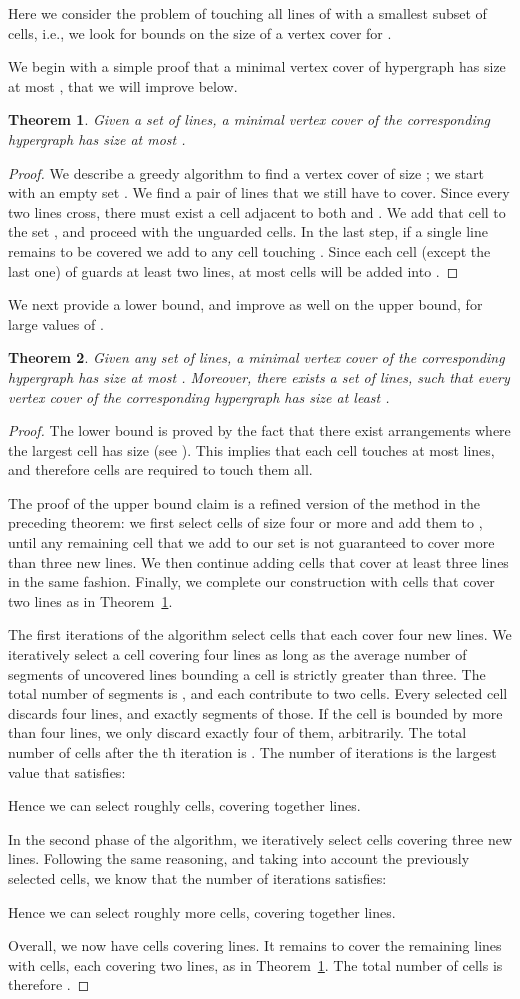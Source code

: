 \documentclass[11pt,a4paper]{article}
\newtheorem{theorem}{Theorem}
\newcommand{\sholong}[2]{#2}
\newcommand{\proofguardwithcells}{The first iterations of the algorithm select cells that each cover four new lines. 
We iteratively select a cell covering four lines as long as the average number of segments of uncovered lines bounding a cell is strictly greater than three. The total number of segments is , and each contribute to two cells. Every selected cell discards four lines, and exactly  segments of those. If the cell is bounded by more than four lines, we only discard exactly four of them, arbitrarily. The total number of cells after the th iteration is . The number of iterations is the largest value  that satisfies:

Hence we can select roughly  cells, covering together  lines.

In the second phase of the algorithm, we iteratively select cells covering three new lines. Following the same reasoning, and taking into account the  previously selected cells, we know that the number  of iterations satisfies:

Hence we can select roughly  more cells, covering together  lines.

Overall, we now have  cells covering  lines. It remains to cover the remaining  lines with  cells, each covering two lines, as in Theorem~\ref{warmup:guardwithcells}. The total number of cells is therefore
}
\begin{document}
Here we consider the problem of touching all lines of  with a smallest subset of cells, i.e., we look for bounds on the size of a vertex cover for .



We begin with a simple proof that a minimal vertex cover of  hypergraph has size at most , that we will improve below.
\begin{theorem}\label{warmup:guardwithcells}
Given a set  of  lines, a minimal vertex cover of the corresponding  hypergraph has size at most .
\end{theorem}
\begin{proof}
We describe a greedy algorithm to find a vertex cover of size ; we start with an empty set . We find a pair  of lines that we still have to cover. Since every two lines cross, there must exist a cell  adjacent to both  and . We add that cell  to the set , and proceed with the unguarded cells. In the last step, if a single line  remains to be covered we add  to  any cell touching . Since each cell (except the last one) of  guards at least two lines, at most  cells will be added into .
\end{proof}

We next provide a lower bound, and improve as well on the upper bound, for large values of . 
\begin{theorem}\label{guardwithcells}
Given any set  of  lines, a minimal vertex cover of the corresponding  hypergraph has size at most . Moreover, there exists a set  of  lines, such that every vertex cover of the corresponding  hypergraph has size at least .
\end{theorem}
\begin{proof}
The lower bound is proved by the fact that there exist arrangements where the largest cell has size  (see \cite{LLMSU07}). This implies that each cell touches at most  lines, and therefore  cells are required to touch them all.

The proof of the upper bound claim is a refined version of the method in the preceding theorem: we
first select cells of size four or more and add them to , until any remaining cell that we add to our set is not guaranteed to cover more than three new lines. We then continue adding cells that cover at least three lines in the same fashion. Finally, we complete our construction with cells that cover two lines as in Theorem~\ref{warmup:guardwithcells}. \sholong{Details can be found in the Appendix}{

\proofguardwithcells}.
\end{proof}
\end{document}
